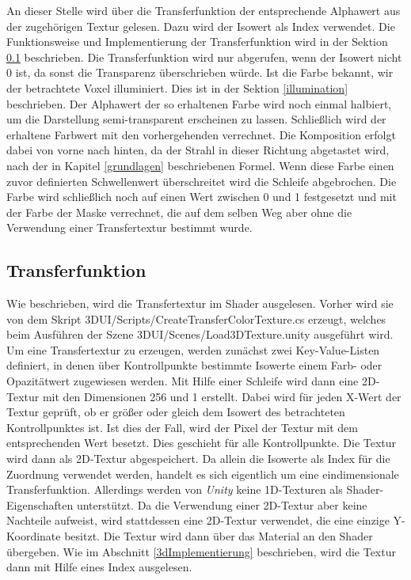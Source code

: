 An dieser Stelle wird über die Transferfunktion der entsprechende Alphawert aus der zugehörigen Textur gelesen. Dazu wird der Isowert als Index verwendet. Die Funktionsweise und Implementierung der Transferfunktion wird in der Sektion \ref{transfer} beschrieben.
Die Transferfunktion wird nur abgerufen, wenn der Isowert nicht 0 ist, da sonst die Transparenz überschrieben würde.
Ist die Farbe bekannt, wir der betrachtete Voxel illuminiert. Dies ist in der Sektion \ref{illumination} beschrieben. 
Der Alphawert der so erhaltenen Farbe wird noch einmal halbiert, um die Darstellung semi-transparent erscheinen zu lassen.
Schließlich wird der erhaltene Farbwert mit den vorhergehenden verrechnet. Die Komposition erfolgt dabei von vorne nach hinten, da der Strahl in dieser Richtung abgetastet wird, nach der in Kapitel \ref{grundlagen} beschriebenen Formel.
Wenn diese Farbe einen zuvor definierten Schwellenwert überschreitet wird die Schleife abgebrochen. 
Die Farbe wird schließlich noch auf einen Wert zwischen 0 und 1 festgesetzt und mit der Farbe der Maske verrechnet, die auf dem selben Weg aber ohne die Verwendung einer Transfertextur bestimmt wurde.

\subsection{Transferfunktion}
\label{transfer}

Wie beschrieben, wird die Transfertextur im Shader ausgelesen. Vorher wird sie von dem Skript 3DUI/Scripts/CreateTransferColorTexture.cs erzeugt, welches beim Ausführen der Szene 3DUI/Scenes/Load3DTexture.unity ausgeführt wird.
Um eine Transfertextur zu erzeugen, werden zunächst zwei Key-Value-Listen definiert, in denen über Kontrollpunkte bestimmte Isowerte einem Farb- oder Opazitätwert zugewiesen werden. Mit Hilfe einer Schleife wird dann eine 2D-Textur mit den Dimensionen 256 und 1 erstellt. Dabei wird für jeden X-Wert der Textur geprüft, ob er größer oder gleich dem Isowert des betrachteten Kontrollpunktes ist. Ist dies der Fall, wird der Pixel der Textur mit dem entsprechenden Wert besetzt. Dies geschieht für alle Kontrollpunkte.
Die Textur wird dann als 2D-Textur abgespeichert. Da allein die Isowerte als Index für die Zuordnung verwendet werden, handelt es sich eigentlich um eine eindimensionale Transferfunktion. 
Allerdings werden von \textit{Unity} keine 1D-Texturen als Shader-Eigenschaften unterstützt. Da die Verwendung einer 2D-Textur aber keine Nachteile aufweist, wird stattdessen eine 2D-Textur verwendet, die eine einzige Y-Koordinate besitzt. 
Die Textur wird dann über das Material an den Shader übergeben. Wie im Abschnitt \ref{3dImplementierung} beschrieben, wird die Textur dann mit Hilfe eines Index ausgelesen.


